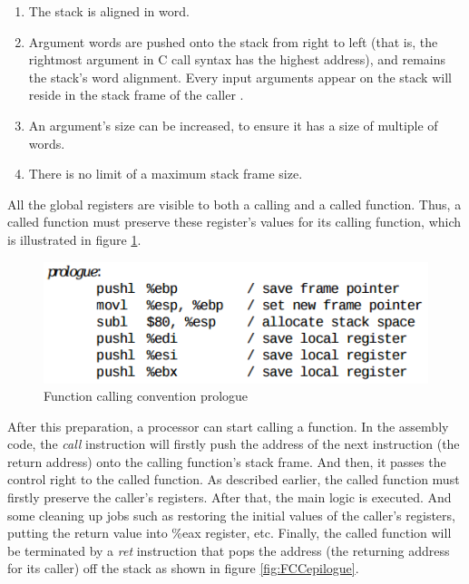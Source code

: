             \begin{enumerate}
                \item The stack is aligned in word.
                \item Argument words are pushed onto the stack from right to left (that is, the rightmost argument in C call syntax has the highest address), and remains the stack's word alignment\cite{SCO-386}. Every input arguments appear on the stack will reside
                in the stack frame of the caller \cite{SCO-386}.
                \item An argument's size can be increased, to ensure it has a size of multiple of words.
                \item There is no limit of a maximum stack frame size.
            \end{enumerate}
            
        All the global registers are visible to both a calling and a called function. Thus, a called function must preserve these register's values for its calling function, which is illustrated in figure \ref{fig:FCCPrologue}.   
        
               \begin{figure}[H]
                    \centering
                    \includegraphics[scale = 0.5]
                    {Images/concepts/FCCPrologue.png}
                    \caption[Function calling convention prologue]%
                    {Function calling convention prologue\cite{SCO-386}}    
                    \label{fig:FCCPrologue}
              \end{figure}
        
        After this preparation, a processor can start calling a function. In the assembly code, the \textit{call} instruction will firstly push the address of the next instruction (the return address) onto the calling function's stack frame. And then, it passes the control right to the called function. As described earlier, the called function must firstly preserve the caller's registers. After that, the main logic is executed. And some cleaning up jobs such as restoring the initial values of the caller's registers, putting the return value into \%eax register, etc. Finally, the called function will be terminated by a \textit{ret} instruction that pops the address (the returning address for its caller) off the stack as shown in figure \ref{fig:FCCepilogue}. 
        
